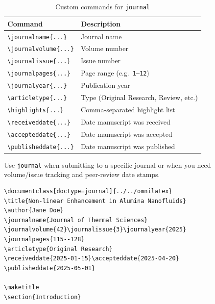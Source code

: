 \begin{table}[htbp]
    \centering
    \caption{Custom commands for \texttt{journal}}
    \label{tab:journal-commands}
    \begin{tabular}{@{} l p{8cm} @{}}
        \toprule
        \textbf{Command} & \textbf{Description} \\
        \midrule
        \texttt{\textbackslash journalname\{...\}}        & Journal name \\
        \texttt{\textbackslash journalvolume\{...\}}      & Volume number \\
        \texttt{\textbackslash journalissue\{...\}}       & Issue number \\
        \texttt{\textbackslash journalpages\{...\}}       & Page range (e.g.\ \texttt{1--12}) \\
        \texttt{\textbackslash journalyear\{...\}}        & Publication year \\
        \texttt{\textbackslash articletype\{...\}}        & Type (Original Research, Review, etc.) \\
        \texttt{\textbackslash highlights\{...\}}         & Comma-separated highlight list \\
        \texttt{\textbackslash receiveddate\{...\}}       & Date manuscript was received \\
        \texttt{\textbackslash accepteddate\{...\}}       & Date manuscript was accepted \\
        \texttt{\textbackslash publisheddate\{...\}}      & Date manuscript was published \\
        \bottomrule
    \end{tabular}
\end{table}

Use \texttt{journal} when submitting to a specific journal or when you need
volume/issue tracking and peer-review date stamps.

\begin{verbatim}
\documentclass[doctype=journal]{../../omnilatex}
\title{Non-linear Enhancement in Alumina Nanofluids}
\author{Jane Doe}
\journalname{Journal of Thermal Sciences}
\journalvolume{42}\journalissue{3}\journalyear{2025}
\journalpages{115--128}
\articletype{Original Research}
\receiveddate{2025-01-15}\accepteddate{2025-04-20}
\publisheddate{2025-05-01}

\maketitle
\section{Introduction}

\end{verbatim}

